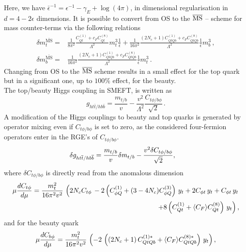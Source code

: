 	Here, we have $\bar{\epsilon}^{-1} = \epsilon^{-1}- \gamma_E +\log(4 \pi)$, in dimensional regularisation in $d=4-2\epsilon$ dimensions. 
	It is possible to convert from OS to the $\MSbar$ -- scheme for mass counter-terms via the following relations
	\begin{align}
		\delta m_t^{\bar{\text{MS}}} =&\frac{1}{8 \pi^2} \frac{C_{Qt}^{(1)}+c_F C_{Qt}^{(8)}}{\Lambda^2}m_t^3\frac{1}{\bar{\epsilon}}+ \frac{1}{16 \pi^2}  \frac{(2 N_c+1) C_{QtQb}^{(1)}+c_F C_{QtQb}^{(8)}}{\Lambda^2}   \frac{1}{\bar{\epsilon}}  m_b^3\,,  \\
		\delta m_b^{\bar{\text{MS}}}=&\frac{1}{16 \pi^2} \frac{(2 N_c+1)C_{QtQb}^{(1)}+c_F C_{QtQb}^{(8)}}{\Lambda^2}\frac{1}{\bar{\epsilon}} m_t^3\,.
	\end{align} 
	Changing from OS to the  $\MSbar$ scheme results in a small effect for the top quark but in a significant one, up to $100\%$ effect, for the beauty. \\
	The top/beauty Higgs coupling in SMEFT, is written as
	\begin{equation}
		g_{ht\bar{t}/hb\bar{b}}=\frac{m_{t/b}}{v}-\frac{v^2}{\Lambda^2}\frac{C_{t\phi/b\phi}}{\sqrt{2}}\,.
	\end{equation}
	A modification of the Higgs couplings to beauty and top quarks is generated by operator mixing even if $C_{t\phi/b\phi}$ is set to zero, as the considered four-fermion operators enter in the RGE's of $C_{t\phi/b\phi}$.
	\begin{align}
		\delta	g_{ht\bar{t}/hb\bar{b}} &=  {m_{t/b}\over v} \delta{m_{t/b}} -{v^2 \delta{C_{t\phi/b\phi}}\over \sqrt{2} },
	\end{align}
	where $\delta{C_{t\phi/b\phi}}$ is directly read from the anomalous dimension~\cite{Alonso:2013hga}
\begin{align}
	\mu \frac{d \cuh}{d \mu} = \frac{m_t^2}{16\pi^2v^2}\,\left( 2 N_c \cuh\, -2 \left( C_{\phi Q}^{(1)} +(3-4N_c) C_{\phi Q}^{(3)} \right) \,y_t +2C_{\phi t} \,y_t+C_{\phi t}\,y_t \right.\nonumber   \\\left. \qquad \qquad+ 8\left( C_{Qt}^{(1)}+ \langle C_F \rangle C_{Qt}^{(8)} \right)\,y_t  \right),
\end{align}
and for the beauty quark
\begin{align}
	\mu \frac{d \cbh}{d \mu} = \frac{m_t^2}{16\pi^2v^2}\,\left(  -2\,\left( (2N_c+1)\,\cquqd^{(1)*}+\langle C_F \rangle \cquqd^{(8)*}\right)  \,y_t \right),
\end{align}
